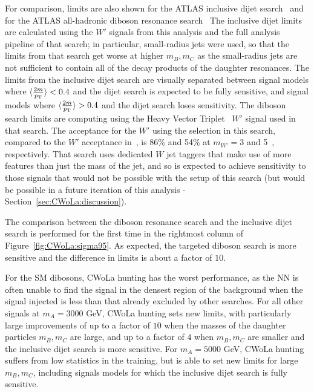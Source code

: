 For comparison, limits are also shown for the ATLAS inclusive dijet search~\cite{Aad:2019hjw} and for the ATLAS all-hadronic diboson resonance search~\cite{Aad:2019fbh}
The inclusive dijet limits are calculated using the $W'$ signals from this analysis and the full analysis pipeline of that search;
in particular, small-radius jets were used, so that the limits from that search get worse at higher $m_B,m_C$ as the small-radius jets are not sufficient to contain all of the decay products of the daughter resonances.
The limits from the inclusive dijet search are visually separated between signal models where $\langle \frac{2m}{p_{\text{T}}}\rangle < 0.4$ and the dijet search is expected to be fully sensitive, and signal models where $\langle \frac{2m}{p_{\text{T}}}\rangle > 0.4$ and the dijet search loses sensitivity.
The diboson search limits are computing using the Heavy Vector Triplet~\cite{Pappadopulo:2014qza} $W'$ signal used in that search.
The acceptance for the $W'$ using the selection in this search, compared to the $W'$ acceptance in~\cite{Aad:2019fbh}, is 86\% and 54\% at $m_{W'}=3$ and 5~\TeV, respectively.
That search uses dedicated $W$ jet taggers that make use of more features than just the mass of the jet, and so is expected to achieve sensitivity to those signals that would not be possible with the setup of this search (but would be possible in a future iteration of this analysis - Section~\ref{sec:CWoLa:discussion}).

The comparison between the diboson resonance search and the inclusive dijet search is performed for the first time in the rightmost column of Figure~\ref{fig:CWoLa:sigma95}.
As expected, the targeted diboson search is more sensitive and the difference in limits is about a factor of $10$.

For the SM dibosons, CWoLa hunting has the worst performance, as the NN is often unable to find the signal in the densest region of the background when the signal injected is less than that already excluded by other searches.
For all other signals at $m_A=3000$ GeV, CWoLa hunting sets new limits, with particularly large improvements of up to a factor of $10$ when the masses of the daughter particles $m_B,m_C$ are large, and up to a factor of $4$ when $m_B,m_C$ are smaller and the inclusive dijet search is more sensitive.
For $m_A=5000$ GeV, CWoLa hunting suffers from low statistics in the training, but is able to set new limits for large $m_B,m_C$, including signals models for which the inclusive dijet search is fully sensitive.

